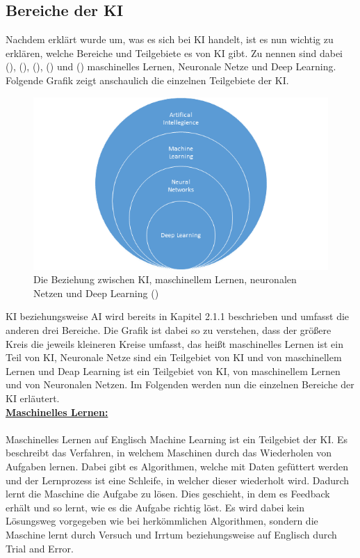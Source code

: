 \documentclass[12pt,toc=bib,toc=listof]{scrreprt}
\begin{document}
\subsection{Bereiche der KI} %
\label{sec:bereicheDerKI}
Nachdem erklärt wurde um, was es sich bei KI handelt, ist es nun wichtig zu erklären, welche Bereiche und Teilgebiete es von KI gibt. Zu nennen sind dabei (\cite{Bhatt2021}), (\cite{Hecker2018}), (\cite{Mocko2021}), (\cite{Roscher2025}) und (\cite{Zhu2021}) maschinelles Lernen, Neuronale Netze und Deep Learning.
Folgende Grafik zeigt anschaulich die einzelnen Teilgebiete der KI.
\begin{figure} [H]
    \centering
    \includegraphics[width=0.75\linewidth]{./Bilder/Mocko_Die Beziehung zwischen KI, maschinellem Lernen, neuronalen Netzen und Deep Learning.png}
    \caption{Die Beziehung zwischen KI, maschinellem Lernen, neuronalen Netzen und Deep Learning (\cite{Mocko2021})}
    \label{fig:enter-label}
\end{figure}
\noindent KI beziehungsweise AI wird bereits in Kapitel 2.1.1 beschrieben und umfasst die anderen drei Bereiche. Die Grafik ist dabei so zu verstehen, dass der größere Kreis die jeweils kleineren Kreise umfasst, das heißt maschinelles Lernen ist ein Teil von KI, Neuronale Netze sind ein Teilgebiet von KI und von maschinellem Lernen und Deap Learning ist ein Teilgebiet von KI, von maschinellem Lernen und von Neuronalen Netzen. Im Folgenden werden nun die einzelnen Bereiche der KI erläutert.\\
\newpage
\noindent\textbf{\underline{Maschinelles Lernen:}}\\
\\
Maschinelles Lernen auf Englisch Machine Learning ist ein Teilgebiet der KI. Es beschreibt das Verfahren, in welchem Maschinen durch das Wiederholen von Aufgaben lernen. Dabei gibt es Algorithmen, welche mit Daten gefüttert werden und der Lernprozess ist eine Schleife, in welcher dieser wiederholt wird. Dadurch lernt die Maschine die Aufgabe zu lösen. Dies geschieht, in dem es Feedback erhält und so lernt, wie es die Aufgabe richtig löst. Es wird dabei kein Lösungsweg vorgegeben wie bei herkömmlichen Algorithmen, sondern die Maschine lernt durch Versuch und Irrtum beziehungsweise auf Englisch durch Trial and Error.\\
\end{document}
